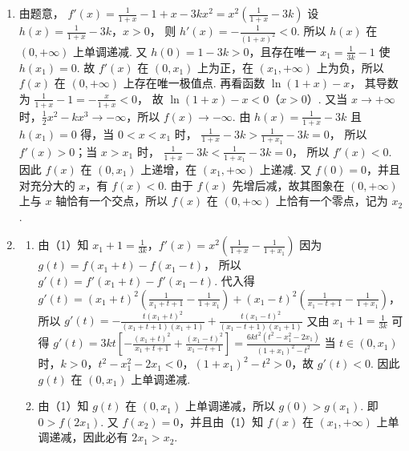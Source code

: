 \documentclass[UTF8,a4paper,oneside,11pt]{ctexbook}
\begin{document}
\begin{solution}
\begin{enumerate}
\item 由题意，
\(
f'(x)=\frac{1}{1+x}-1+x-3kx^2=x^2\left(\frac{1}{1+x}-3k\right)
\)
设
\(h(x)=\frac{1}{1+x}-3k\)，\(x>0\)，
则
\(h'(x)=-\frac{1}{(1+x)^2}<0\).
所以 \(h(x)\) 在 \((0,+\infty)\) 上单调递减. 又 \(h(0)=1-3k>0\)，且存在唯一
\(x_1=\frac{1}{3k}-1\)
使 \(h(x_1)=0\). 故 \(f'(x)\) 在 \((0,x_1)\) 上为正，在 \((x_1,+\infty)\) 上为负，所以 \(f(x)\) 在 \((0,+\infty)\) 上存在唯一极值点.
再看函数
\(\ln(1+x)-x\)，
其导数为
\(\frac{1}{1+x}-1=-\frac{x}{1+x}<0\)，
故 \(\ln(1+x)-x<0\)（\(x>0\)）. 又当 \(x\to +\infty\) 时，\(\frac12x^2-kx^3\to -\infty\)，所以
\(f(x)\to -\infty\).
由 \(h(x)=\frac{1}{1+x}-3k\) 且 \(h(x_1)=0\) 得，当 \(0<x<x_1\) 时，
\(\frac{1}{1+x}-3k>\frac{1}{1+x_1}-3k=0\)，
所以 \(f'(x)>0\)；当 \(x>x_1\) 时，
\(\frac{1}{1+x}-3k<\frac{1}{1+x_1}-3k=0\)，
所以 \(f'(x)<0\). 因此 \(f(x)\) 在 \((0,x_1)\) 上递增，在 \((x_1,+\infty)\) 上递减.
又 \(f(0)=0\)，并且对充分大的 \(x\)，有 \(f(x)<0\). 由于 \(f(x)\) 先增后减，故其图象在 \((0,+\infty)\) 上与 \(x\) 轴恰有一个交点，所以 \(f(x)\) 在 \((0,+\infty)\) 上恰有一个零点，记为 \(x_2\).

\item
\begin{enumerate}
\item 由（1）知
\(x_1+1=\frac{1}{3k}\)，\(f'(x)=x^2\left(\frac{1}{1+x}-\frac{1}{1+x_1}\right)\)
因为
\(g(t)=f(x_1+t)-f(x_1-t)\)，
所以
\(g'(t)=f'(x_1+t)-f'(x_1-t)\).
代入得
\(
g'(t)=(x_1+t)^2\left(\frac{1}{x_1+t+1}-\frac{1}{1+x_1}\right)
+(x_1-t)^2\left(\frac{1}{x_1-t+1}-\frac{1}{1+x_1}\right)
\)，
所以
\(
g'(t)=-\frac{t(x_1+t)^2}{(x_1+t+1)(x_1+1)}
+\frac{t(x_1-t)^2}{(x_1-t+1)(x_1+1)}
\)
又由 \(x_1+1=\frac{1}{3k}\) 可得
\(
g'(t)=3kt\left[-\frac{(x_1+t)^2}{x_1+t+1}+\frac{(x_1-t)^2}{x_1-t+1}\right]
=\frac{6kt^2(t^2-x_1^2-2x_1)}{(1+x_1)^2-t^2}
\)
当 \(t\in(0,x_1)\) 时，\(k>0\)，\(t^2-x_1^2-2x_1<0\)，\((1+x_1)^2-t^2>0\)，故
\(g'(t)<0\).
因此 \(g(t)\) 在 \((0,x_1)\) 上单调递减.

\item 由（1）知 \(g(t)\) 在 \((0,x_1)\) 上单调递减，所以
\(g(0)>g(x_1)\).
即
\(0>f(2x_1)\).
又 \(f(x_2)=0\)，并且由（1）知 \(f(x)\) 在 \((x_1,+\infty)\) 上单调递减，因此必有
\(2x_1>x_2\).
\end{enumerate}
\end{enumerate}
\end{solution}
\end{document}
